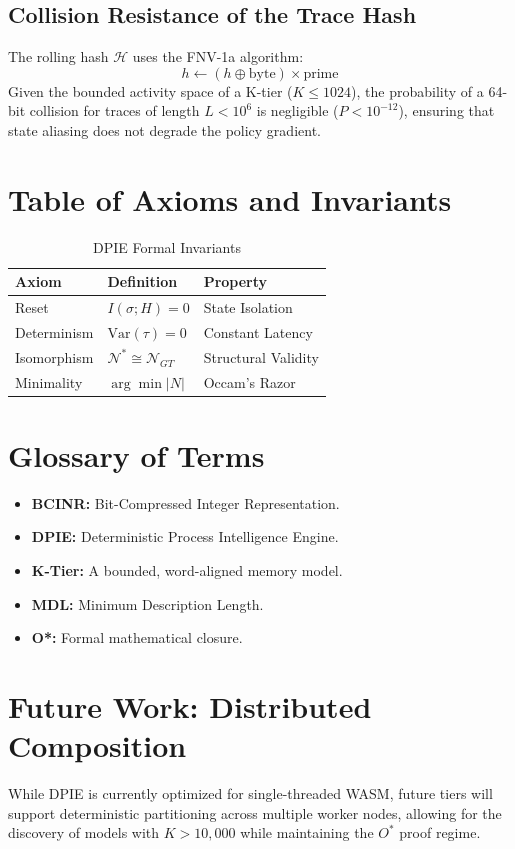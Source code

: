 \documentclass[12pt,a4paper]{report}
\begin{document}
\section{Collision Resistance of the Trace Hash}
The rolling hash $\mathcal{H}$ uses the FNV-1a algorithm:
\begin{equation}
h \leftarrow (h \oplus \text{byte}) \times \text{prime}
\end{equation}
Given the bounded activity space of a K-tier ($K \leq 1024$), the probability of a 64-bit collision for traces of length $L < 10^6$ is negligible ($P < 10^{-12}$), ensuring that state aliasing does not degrade the policy gradient.

\chapter{Table of Axioms and Invariants}
\begin{table}[ht]
\centering
\caption{DPIE Formal Invariants}
\begin{tabular}{lll}
\toprule
Axiom & Definition & Property \\
\midrule
Reset & $I(\sigma; H) = 0$ & State Isolation \\
Determinism & $\text{Var}(\tau) = 0$ & Constant Latency \\
Isomorphism & $\mathcal{N}^* \cong \mathcal{N}_{GT}$ & Structural Validity \\
Minimality & $\arg\min |N|$ & Occam's Razor \\
\bottomrule
\end{tabular}
\end{table}

\chapter{Glossary of Terms}
\begin{itemize}
    \item \textbf{BCINR:} Bit-Compressed Integer Representation.
    \item \textbf{DPIE:} Deterministic Process Intelligence Engine.
    \item \textbf{K-Tier:} A bounded, word-aligned memory model.
    \item \textbf{MDL:} Minimum Description Length.
    \item \textbf{O*:} Formal mathematical closure.
\end{itemize}

\chapter{Future Work: Distributed Composition}
While DPIE is currently optimized for single-threaded WASM, future tiers will support deterministic partitioning across multiple worker nodes, allowing for the discovery of models with $K > 10,000$ while maintaining the $O^*$ proof regime.
\end{document}
